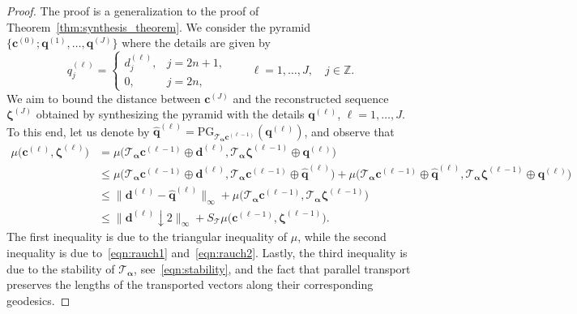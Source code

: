 \documentclass[12pt]{article}
\begin{document}
\begin{proof}
    The proof is a generalization to the proof of Theorem~\ref{thm:synthesis_theorem}. We consider the pyramid $\{\boldsymbol{c}^{(0)};\boldsymbol{q}^{(1)},\dots, \boldsymbol{q}^{(J)}\}$ where the details are given by
    \begin{equation*}
        q_{j}^{(\ell)} = \begin{cases}
            d^{(\ell)}_j, & j=2n+1, \\
            0, & j=2n,
        \end{cases} \quad \quad\ell=1,\dots, J, \quad j\in\mathbb{Z}.
    \end{equation*}
    We aim to bound the distance between $\boldsymbol{c}^{(J)}$ and the reconstructed sequence $\boldsymbol{\zeta}^{(J)}$ obtained by synthesizing the pyramid with the details $\boldsymbol{q}^{(\ell)}$, $\ell=1,\dots, J$. To this end, let us denote by $\widehat{\boldsymbol{q}}^{(\ell)}=\text{PG}_{\mathcal{T}_{\boldsymbol{\alpha}}\boldsymbol{c}^{(\ell-1)}}(\boldsymbol{q}^{(\ell)})$, and observe that
    \begin{align*}
        \mu\big(\boldsymbol{c}^{(\ell)}, \boldsymbol{\zeta}^{(\ell)}\big) & = \mu\big(\mathcal{T}_{\boldsymbol{\alpha}}\boldsymbol{c}^{(\ell-1)}\oplus\boldsymbol{d}^{(\ell)}, \mathcal{T}_{\boldsymbol{\alpha}}\boldsymbol{\zeta}^{(\ell-1)}\oplus\boldsymbol{q}^{(\ell)}\big) \\
        & \leq \mu\big(\mathcal{T}_{\boldsymbol{\alpha}}\boldsymbol{c}^{(\ell-1)}\oplus\boldsymbol{d}^{(\ell)}, \mathcal{T}_{\boldsymbol{\alpha}}\boldsymbol{c}^{(\ell-1)}\oplus\widehat{\boldsymbol{q}}^{(\ell)}\big) + \mu\big( \mathcal{T}_{\boldsymbol{\alpha}}\boldsymbol{c}^{(\ell-1)}\oplus\widehat{\boldsymbol{q}}^{(\ell)}, \mathcal{T}_{\boldsymbol{\alpha}}\boldsymbol{\zeta}^{(\ell-1)}\oplus\boldsymbol{q}^{(\ell)}\big) \\
        & \leq \|\boldsymbol{d}^{(\ell)}-\widehat{\boldsymbol{q}}^{(\ell)}\|_\infty + \mu\big( \mathcal{T}_{\boldsymbol{\alpha}}\boldsymbol{c}^{(\ell-1)}, \mathcal{T}_{\boldsymbol{\alpha}}\boldsymbol{\zeta}^{(\ell-1)}\big) \\
        & \leq \|\boldsymbol{d}^{(\ell)}\downarrow 2\|_\infty + S_{\mathcal{T}} \mu\big(\boldsymbol{c}^{(\ell-1)}, \boldsymbol{\zeta}^{(\ell-1)}\big).
    \end{align*}
    The first inequality is due to the triangular inequality of $\mu$, while the second inequality is due to~\eqref{eqn:rauch1} and~\eqref{eqn:rauch2}. Lastly, the third inequality is due to the stability of $\mathcal{T}_{\boldsymbol{\alpha}}$, see~\eqref{eqn:stability}, and the fact that parallel transport preserves the lengths of the transported vectors along their corresponding geodesics.

\end{proof}
\end{document}
